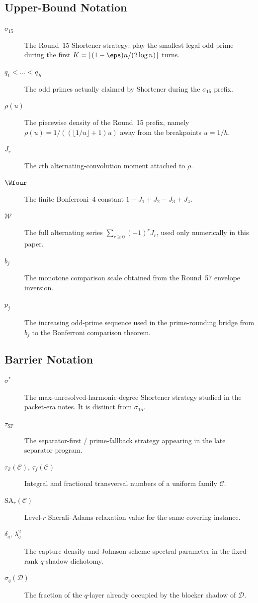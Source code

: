 \subsection{Upper-Bound Notation}

\begin{description}
  \item[$\sigma_{15}$] The Round~15 Shortener strategy: play the smallest legal
  odd prime during the first
  $K=\lfloor (1-\eps)n/(2\log n)\rfloor$ turns.
  \item[$q_1<\dots<q_K$] The odd primes actually claimed by Shortener during the
  $\sigma_{15}$ prefix.
  \item[$\rho(u)$] The piecewise density of the Round~15 prefix, namely
  $\rho(u)=1/((\lfloor 1/u\rfloor+1)u)$ away from the breakpoints $u=1/h$.
  \item[$J_r$] The $r$th alternating-convolution moment attached to $\rho$.
  \item[$\Wfour$] The finite Bonferroni--4 constant
  $1-J_1+J_2-J_3+J_4$.
  \item[$\mathcal W$] The full alternating series
  $\sum_{r\ge 0}(-1)^rJ_r$, used only numerically in this paper.
  \item[$b_j$] The monotone comparison scale obtained from the Round~57 envelope
  inversion.
  \item[$p_j$] The increasing odd-prime sequence used in the prime-rounding
  bridge from $b_j$ to the Bonferroni comparison theorem.
\end{description}

\subsection{Barrier Notation}

\begin{description}
  \item[$\sigma^*$] The max-unresolved-harmonic-degree Shortener strategy
  studied in the packet-era notes.  It is distinct from $\sigma_{15}$.
  \item[$\tau_{\mathrm{SF}}$] The separator-first / prime-fallback strategy
  appearing in the late separator program.
  \item[$\tau_{\mathbb Z}(\mathcal C)$, $\tau_f(\mathcal C)$] Integral and
  fractional transversal numbers of a uniform family $\mathcal C$.
  \item[$\mathrm{SA}_r(\mathcal C)$] Level-$r$ Sherali--Adams relaxation value
  for the same covering instance.
  \item[$\delta_q$, $\lambda_q^2$] The capture density and Johnson-scheme
  spectral parameter in the fixed-rank $q$-shadow dichotomy.
  \item[$\sigma_q(\mathcal D)$] The fraction of the $q$-layer already occupied
  by the blocker shadow of $\mathcal D$.
\end{description}
